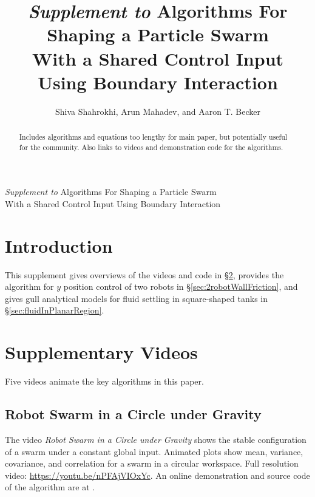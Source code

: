 \title{\huge{ \emph{Supplement to} 
Algorithms For Shaping a Particle Swarm\\ With a Shared Control Input Using Boundary Interaction}}

\author{Shiva Shahrokhi, Arun Mahadev, and Aaron T. Becker}

\newpage
\maketitle

{\huge{ \emph{Supplement to} 
Algorithms For Shaping a Particle Swarm\\ With a Shared Control Input Using Boundary Interaction}}\\

\begin{abstract}
Includes algorithms and equations too lengthy for main paper, but potentially useful for the community.
Also links to videos and demonstration code for the algorithms.


\end{abstract}

\IEEEpeerreviewmaketitle

\section{Introduction}
This supplement gives overviews of the videos and code in 
\S \ref{sec:Videos}, 
provides the algorithm for $y$ position control of two robots in
\S \ref{sec:2robotWallFriction},
and gives gull analytical models for fluid settling in square-shaped tanks in
\S \ref{sec:fluidInPlanarRegion}.


\section{Supplementary Videos}\label{sec:Videos}
Five videos animate the key algorithms in this paper.

\subsection{Robot Swarm in a Circle under Gravity}
The video \emph{Robot Swarm in a Circle under Gravity} shows the stable configuration of a swarm under a constant global input.  Animated plots show mean, variance, covariance, and correlation for a swarm in a circular workspace.
Full resolution video: \url{https://youtu.be/nPFAjVIOxYc}.
An online demonstration and source code of the algorithm are at \citet{Zhao2016mathematicaSquare}.

